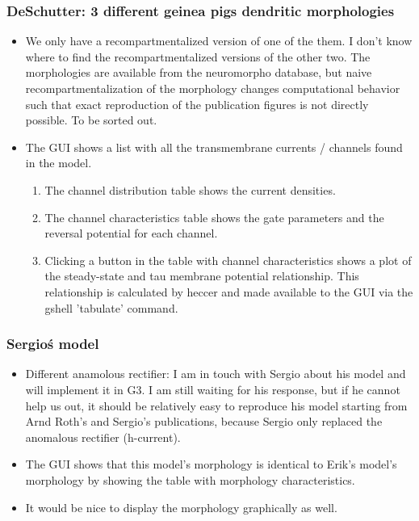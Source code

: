 \documentclass[12pt]{article}
\begin{document}
\subsubsection{DeSchutter: 3 different geinea pigs dendritic morphologies}
\begin{itemize}
\item We only have a recompartmentalized version of one of the them.
  I don't know where to find the recompartmentalized versions of the
  other two.  The morphologies are available from the neuromorpho
  database, but naive recompartmentalization of the morphology changes
  computational behavior such that exact reproduction of the
  publication figures is not directly possible.  To be sorted out.
\item The GUI shows a list with all the transmembrane currents /
  channels found in the model.
  \begin{enumerate}
  \item The channel distribution table shows the current densities.
  \item The channel characteristics table shows the gate parameters
    and the reversal potential for each channel.
  \item Clicking a button in the table with channel characteristics
    shows a plot of the steady-state and tau membrane potential
    relationship.  This relationship is calculated by heccer and made
    available to the GUI via the gshell 'tabulate' command.
  \end{enumerate}
\end{itemize}


\subsubsection{Sergio\'s model}
\begin{itemize}
\item Different anamolous rectifier: I am in touch with Sergio about
  his model and will implement it in G3.  I am still waiting for his
  response, but if he cannot help us out, it should be relatively easy
  to reproduce his model starting from Arnd Roth's and Sergio's
  publications, because Sergio only replaced the anomalous rectifier
  (h-current).
\item The GUI shows that this model's morphology is identical to
  Erik's model's morphology by showing the table with morphology
  characteristics.
\item It would be nice to display the morphology graphically as well.
\end{itemize}
\end{document}
